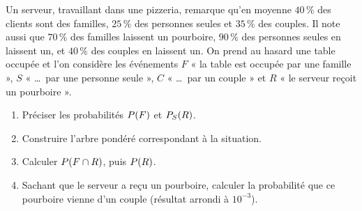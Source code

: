 \begin{annales}
Un serveur, travaillant dans une pizzeria, remarque qu'en moyenne $40\,\%$
des clients sont des familles, $25\,\%$ des personnes seules et $35\,\%$ des
couples. Il note aussi que $70\,\%$ des familles laissent un pourboire,
$90\,\%$ des personnes seules en laissent un, et $40\,\%$ des couples en
laissent un. On prend au hasard une table occupée et l'on considère les
événements $F$ « la table est occupée par une famille », $S$ « \ldots\ par
une personne seule », $C$ « \ldots\ par un couple » et $R$ « le serveur
reçoit un pourboire ».
\begin{enumerate}[label=\textbf{\arabic*.}, leftmargin=*, itemsep=0.2em]
  \item Préciser les probabilités $\proba{F}$ et $\probacond{R}{S}$.
  \item Construire l'arbre pondéré correspondant à la situation.
  \item Calculer $\proba{F\cap R}$, puis $\proba{R}$.
  \item Sachant que le serveur a reçu un pourboire, calculer la probabilité
        que ce pourboire vienne d'un couple (résultat arrondi à $10^{-3}$).
\end{enumerate}
\end{annales}

